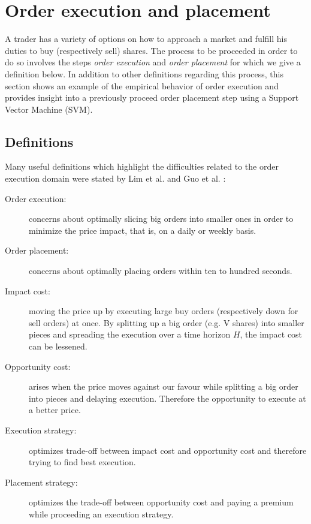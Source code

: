 \section{Order execution and placement}

A trader has a variety of options on how to approach a market and fulfill his duties to buy (respectively sell) shares.
The process to be proceeded in order to do so involves the steps \textit{order execution} and \textit{order placement} for which we give a definition below.
In addition to other definitions regarding this process, this section shows an example of the empirical behavior of order execution and provides insight into a previously proceed order placement step using a Support Vector Machine (SVM).

\subsection{Definitions}

Many useful definitions which highlight the difficulties related to the order execution domain were stated by Lim et al. \cite{lim2005optimal} and Guo et al. \cite{guo2013optimal}:
\begin{description}
    \item[Order execution:] concerns about optimally slicing big orders into smaller ones in order to minimize the price impact, that is, on a daily or weekly basis.
    \item[Order placement: ] concerns about optimally placing orders within ten to hundred seconds.
    \item[Impact cost:] moving the price up by executing large buy orders (respectively down for sell orders) at once. 
    By splitting up a big order (e.g. V shares) into smaller pieces and spreading the execution over a time horizon $H$, the impact cost can be lessened.
    \item[Opportunity cost:] arises when the price moves against our favour while splitting a big order into pieces and delaying execution. 
    Therefore the opportunity to execute at a better price.
    \item[Execution strategy:] optimizes trade-off between impact cost and opportunity cost and therefore trying to find best execution.
    \item[Placement strategy:] optimizes the trade-off between opportunity cost and paying a premium while proceeding an execution strategy.
\end{description}

